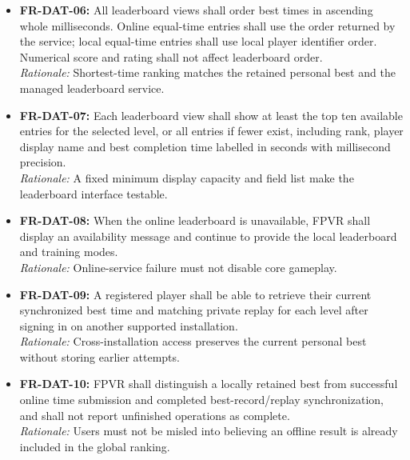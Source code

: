 \documentclass[12pt]{article}
\begin{document}
\begin{itemize}
\textit{Rationale:} The same best-time entries support global and friends comparisons without live multiplayer.
\item \hypertarget{req:FR-DAT-06}{}\textbf{FR-DAT-06:} All leaderboard views shall order best times in ascending whole milliseconds. Online equal-time entries shall use the order returned by the service; local equal-time entries shall use local player identifier order. Numerical score and rating shall not affect leaderboard order.\\
\textit{Rationale:} Shortest-time ranking matches the retained personal best and the managed leaderboard service.
\item \hypertarget{req:FR-DAT-07}{}\textbf{FR-DAT-07:} Each leaderboard view shall show at least the top ten available entries for the selected level, or all entries if fewer exist, including rank, player display name and best completion time labelled in seconds with millisecond precision.\\
\textit{Rationale:} A fixed minimum display capacity and field list make the leaderboard interface testable.
\item \hypertarget{req:FR-DAT-08}{}\textbf{FR-DAT-08:} When the online leaderboard is unavailable, FPVR shall display an availability message and continue to provide the local leaderboard and training modes.\\
\textit{Rationale:} Online-service failure must not disable core gameplay.
\item \hypertarget{req:FR-DAT-09}{}\textbf{FR-DAT-09:} A registered player shall be able to retrieve their current synchronized best time and matching private replay for each level after signing in on another supported installation.\\
\textit{Rationale:} Cross-installation access preserves the current personal best without storing earlier attempts.
\item \hypertarget{req:FR-DAT-10}{}\textbf{FR-DAT-10:} FPVR shall distinguish a locally retained best from successful online time submission and completed best-record/replay synchronization, and shall not report unfinished operations as complete.\\
\textit{Rationale:} Users must not be misled into believing an offline result is already included in the global ranking.
\end{itemize}
\end{document}
